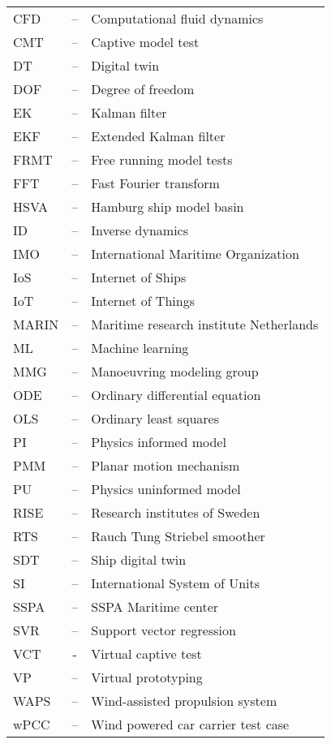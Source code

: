 
\begin{tabular}{ l c l }
CFD & -- & Computational fluid dynamics\\
CMT & -- & Captive model test \\
DT  & -- & Digital twin\\
DOF & -- & Degree of freedom\\
EK & -- & Kalman filter \\
EKF & -- & Extended Kalman filter \\
FRMT & -- & Free running model tests \\
FFT & -- & Fast Fourier transform\\
HSVA & -- & Hamburg ship model basin \\
ID & -- & Inverse dynamics \\
IMO & -- & International Maritime Organization \\
IoS & -- & Internet of Ships \\
IoT & -- & Internet of Things \\
MARIN & -- & Maritime research institute Netherlands \\
ML & -- & Machine learning \\
MMG & -- & Manoeuvring modeling group \\
ODE & -- & Ordinary differential equation\\
OLS & -- & Ordinary least squares\\
PI & -- & Physics informed model \\ 
PMM & -- & Planar motion mechanism \\ 
PU & -- & Physics uninformed model \\
RISE & -- & Research institutes of Sweden \\
RTS & -- & Rauch Tung Striebel smoother \\
SDT  & -- & Ship digital twin\\
SI  & -- & International System of Units\\
SSPA & -- & SSPA Maritime center \\
SVR & -- & Support vector regression \\
VCT & - & Virtual captive test \\
VP & -- & Virtual prototyping \\
WAPS & -- & Wind-assisted propulsion system\\
wPCC & -- & Wind powered car carrier test case\\
\end{tabular}
